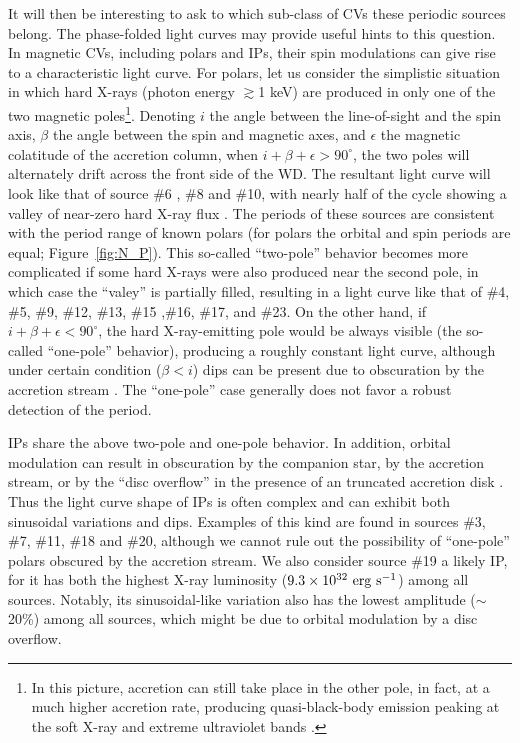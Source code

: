 \documentclass[fleqn,usenatbib]{mnras}
\begin{document}
It will then be interesting to ask to which sub-class of CVs these periodic sources belong. The phase-folded light curves may provide useful hints to this question. 
In magnetic CVs, including polars and IPs, their spin modulations can give rise to a characteristic light curve. For polars, let us consider the simplistic situation in which hard X-rays (photon energy $\gtrsim$1 keV) are produced in only one of the two magnetic poles\footnote{In this picture, accretion can still take place in the other pole, in fact, at a much higher accretion rate, producing quasi-black-body emission peaking at the soft X-ray and extreme ultraviolet bands \citep{2001cvs..book.....H}.}.
Denoting $i$ the angle between the line-of-sight and the spin axis, $\beta$ the angle between the spin and magnetic axes, and $\epsilon$ the magnetic colatitude of the accretion column, when $i+\beta+\epsilon > 90^{\circ}$, the two poles will alternately drift across the front side of the WD. 
The resultant light curve will look like that of source \#6 , \#8 and \#10, with nearly half of the cycle showing a valley of near-zero hard X-ray flux \citep{1985A&A...148L..14H}. 
The periods of these sources are consistent with the period range of known polars (for polars the orbital and spin periods are equal; Figure~\ref{fig:N_P}).
This so-called ``two-pole'' behavior becomes more complicated if some hard X-rays were also produced near the second pole, in which case the ``valey'' is partially filled, resulting in a light curve like that of \#4, \#5, \#9, \#12, \#13, \#15 ,\#16, \#17, and \#23. 
On the other hand, if $i+\beta+\epsilon < 90^{\circ}$, the hard X-ray-emitting pole would be always visible (the so-called ``one-pole'' behavior), producing a roughly constant light curve, although under certain condition ($\beta < i$) dips can be present due to obscuration by the accretion stream \citep{2001cvs..book.....H}. The ``one-pole'' case generally does not favor a robust detection of the period. 

IPs share the above two-pole and one-pole behavior. 
In addition, orbital modulation can result in obscuration by the companion star,
by the accretion stream, or by the ``disc overflow'' in the presence of an truncated accretion disk \citep{1996MNRAS.280..937N}. 
Thus the light curve shape of IPs is often complex and can exhibit both sinusoidal variations and dips. Examples of this kind are found in sources \#3, \#7, \#11, \#18 and \#20, although we cannot rule out the possibility of ``one-pole'' polars obscured by the accretion stream.
We also consider source \#19 a likely IP, for it has both the highest X-ray luminosity ($9.3\times10^{32}{\rm~erg~s^{-1}}$) among all sources. Notably, its sinusoidal-like variation also has the lowest amplitude ($\sim$20\%) among all sources, which might be due to orbital modulation by a disc overflow. 
\end{document}
